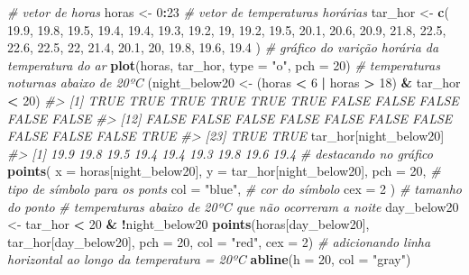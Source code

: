 \documentclass[]{book}
\newenvironment{Shaded}{\begin{snugshade}}{\end{snugshade}}
\newcommand{\KeywordTok}[1]{\textcolor[rgb]{0.13,0.29,0.53}{\textbf{#1}}}
\newcommand{\DataTypeTok}[1]{\textcolor[rgb]{0.13,0.29,0.53}{#1}}
\newcommand{\DecValTok}[1]{\textcolor[rgb]{0.00,0.00,0.81}{#1}}
\newcommand{\FloatTok}[1]{\textcolor[rgb]{0.00,0.00,0.81}{#1}}
\newcommand{\StringTok}[1]{\textcolor[rgb]{0.31,0.60,0.02}{#1}}
\newcommand{\CommentTok}[1]{\textcolor[rgb]{0.56,0.35,0.01}{\textit{#1}}}
\newcommand{\OperatorTok}[1]{\textcolor[rgb]{0.81,0.36,0.00}{\textbf{#1}}}
\newcommand{\NormalTok}[1]{#1}
\begin{document}
\begin{Shaded}
\begin{Highlighting}[]
\CommentTok{# vetor de horas}
\NormalTok{horas <-}\StringTok{ }\DecValTok{0}\OperatorTok{:}\DecValTok{23}
\CommentTok{# vetor de temperaturas horárias}
\NormalTok{tar_hor <-}\StringTok{ }\KeywordTok{c}\NormalTok{(}
  \FloatTok{19.9}\NormalTok{, }\FloatTok{19.8}\NormalTok{, }\FloatTok{19.5}\NormalTok{, }\FloatTok{19.4}\NormalTok{, }\FloatTok{19.4}\NormalTok{, }\FloatTok{19.3}\NormalTok{,}
  \FloatTok{19.2}\NormalTok{, }\DecValTok{19}\NormalTok{, }\FloatTok{19.2}\NormalTok{, }\FloatTok{19.5}\NormalTok{, }\FloatTok{20.1}\NormalTok{, }\FloatTok{20.6}\NormalTok{, }\FloatTok{20.9}\NormalTok{,}
  \FloatTok{21.8}\NormalTok{, }\FloatTok{22.5}\NormalTok{, }\FloatTok{22.6}\NormalTok{, }\FloatTok{22.5}\NormalTok{, }\DecValTok{22}\NormalTok{, }\FloatTok{21.4}\NormalTok{, }\FloatTok{20.1}\NormalTok{,}
  \DecValTok{20}\NormalTok{, }\FloatTok{19.8}\NormalTok{, }\FloatTok{19.6}\NormalTok{, }\FloatTok{19.4}
\NormalTok{)}
\CommentTok{# gráfico do varição horária da temperatura do ar}
\KeywordTok{plot}\NormalTok{(horas, tar_hor, }\DataTypeTok{type =} \StringTok{"o"}\NormalTok{, }\DataTypeTok{pch =} \DecValTok{20}\NormalTok{)}
\CommentTok{# temperaturas noturnas abaixo de 20ºC}
\NormalTok{(night_below20 <-}\StringTok{ }\NormalTok{(horas }\OperatorTok{<}\StringTok{ }\DecValTok{6} \OperatorTok{|}\StringTok{ }\NormalTok{horas }\OperatorTok{>}\StringTok{ }\DecValTok{18}\NormalTok{) }\OperatorTok{&}\StringTok{ }\NormalTok{tar_hor }\OperatorTok{<}\StringTok{ }\DecValTok{20}\NormalTok{)}
\CommentTok{#>  [1]  TRUE  TRUE  TRUE  TRUE  TRUE  TRUE FALSE FALSE FALSE FALSE FALSE}
\CommentTok{#> [12] FALSE FALSE FALSE FALSE FALSE FALSE FALSE FALSE FALSE FALSE  TRUE}
\CommentTok{#> [23]  TRUE  TRUE}
\NormalTok{tar_hor[night_below20]}
\CommentTok{#> [1] 19.9 19.8 19.5 19.4 19.4 19.3 19.8 19.6 19.4}
\CommentTok{# destacando no gráfico}
\KeywordTok{points}\NormalTok{(}
  \DataTypeTok{x =}\NormalTok{ horas[night_below20],}
  \DataTypeTok{y =}\NormalTok{ tar_hor[night_below20],}
  \DataTypeTok{pch =} \DecValTok{20}\NormalTok{, }\CommentTok{# tipo de símbolo para os ponts}
  \DataTypeTok{col =} \StringTok{"blue"}\NormalTok{, }\CommentTok{# cor do símbolo}
  \DataTypeTok{cex =} \DecValTok{2}
\NormalTok{) }\CommentTok{# tamanho do ponto}
\CommentTok{# temperaturas abaixo de 20ºC que não ocorreram a noite}
\NormalTok{day_below20 <-}\StringTok{ }\NormalTok{tar_hor }\OperatorTok{<}\StringTok{ }\DecValTok{20} \OperatorTok{&}\StringTok{ }\OperatorTok{!}\NormalTok{night_below20}
\KeywordTok{points}\NormalTok{(horas[day_below20], tar_hor[day_below20], }\DataTypeTok{pch =} \DecValTok{20}\NormalTok{, }\DataTypeTok{col =} \StringTok{"red"}\NormalTok{, }\DataTypeTok{cex =} \DecValTok{2}\NormalTok{)}
\CommentTok{# adicionando linha horizontal ao longo da temperatura = 20ºC}
\KeywordTok{abline}\NormalTok{(}\DataTypeTok{h =} \DecValTok{20}\NormalTok{, }\DataTypeTok{col =} \StringTok{"gray"}\NormalTok{)}
\end{Highlighting}
\end{Shaded}
\end{document}
